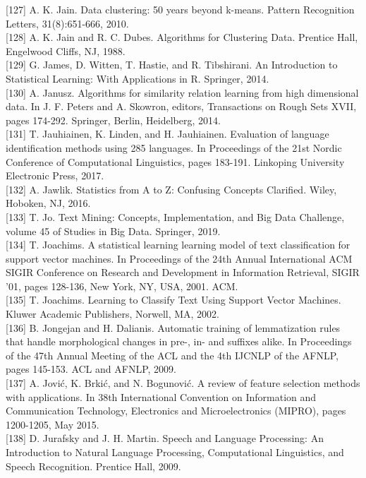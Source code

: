 \documentclass[10pt]{book}
\begin{document}
[127] A. K. Jain. Data clustering: 50 years beyond k-means. Pattern Recognition Letters, 31(8):651-666, 2010.\\[0pt]
[128] A. K. Jain and R. C. Dubes. Algorithms for Clustering Data. Prentice Hall, Engelwood Cliffs, NJ, 1988.\\[0pt]
[129] G. James, D. Witten, T. Hastie, and R. Tibshirani. An Introduction to Statistical Learning: With Applications in R. Springer, 2014.\\[0pt]
[130] A. Janusz. Algorithms for similarity relation learning from high dimensional data. In J. F. Peters and A. Skowron, editors, Transactions on Rough Sets XVII, pages 174-292. Springer, Berlin, Heidelberg, 2014.\\[0pt]
[131] T. Jauhiainen, K. Linden, and H. Jauhiainen. Evaluation of language identification methods using 285 languages. In Proceedings of the 21st Nordic Conference of Computational Linguistics, pages 183-191. Linkoping University Electronic Press, 2017.\\[0pt]
[132] A. Jawlik. Statistics from A to Z: Confusing Concepts Clarified. Wiley, Hoboken, NJ, 2016.\\[0pt]
[133] T. Jo. Text Mining: Concepts, Implementation, and Big Data Challenge, volume 45 of Studies in Big Data. Springer, 2019.\\[0pt]
[134] T. Joachims. A statistical learning learning model of text classification for support vector machines. In Proceedings of the 24th Annual International ACM SIGIR Conference on Research and Development in Information Retrieval, SIGIR '01, pages 128-136, New York, NY, USA, 2001. ACM.\\[0pt]
[135] T. Joachims. Learning to Classify Text Using Support Vector Machines. Kluwer Academic Publishers, Norwell, MA, 2002.\\[0pt]
[136] B. Jongejan and H. Dalianis. Automatic training of lemmatization rules that handle morphological changes in pre-, in- and suffixes alike. In Proceedings of the 47th Annual Meeting of the ACL and the 4th IJCNLP of the AFNLP, pages 145-153. ACL and AFNLP, 2009.\\[0pt]
[137] A. Jović, K. Brkić, and N. Bogunović. A review of feature selection methods with applications. In 38th International Convention on Information and Communication Technology, Electronics and Microelectronics (MIPRO), pages 1200-1205, May 2015.\\[0pt]
[138] D. Jurafsky and J. H. Martin. Speech and Language Processing: An Introduction to Natural Language Processing, Computational Linguistics, and Speech Recognition. Prentice Hall, 2009.\\[0pt]
\end{document}
